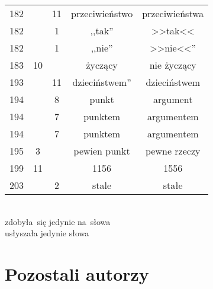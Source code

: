 \documentclass[a4paper,11pt]{article}
\begin{document}
\begin{center}
\begin{tabular}{|c|c|c|c|c|}
    182 & & 11 & przeciwieństwo & przeciwieństwa \\
    182 & &  1 & ,,tak'' & >>tak<<  %
    \\
    182 & &  1 & ,,nie'' & >>nie<<''  %
    \\
    183 & 10 & & życzący & nie życzący \\
    193 & & 11 & dzieciństwem'' & dzieciństwem \\
    194 & &  8 & punkt & argument \\
    194 & &  7 & punktem & argumentem \\
    194 & &  7 & punktem & argumentem \\
    195 &  3 & & pewien punkt & pewne rzeczy \\
    199 & 11 & & 1156 & 1556 \\
    203 & &  2 & stale & stałe \\
    \hline
  \end{tabular}
\end{center}
\noi
{} \\
\Jest zdobyła~się jedynie na~słowa \\
\Pow  usłyszała jedynie słowa \\

\vspace{\spaceTwo}





\newpage
\section{Pozostali autorzy}

\vspace{\spaceTwo}




\end{document}
